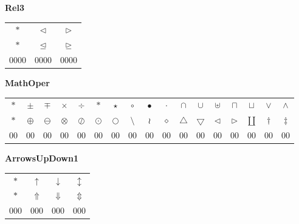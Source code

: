 \documentclass[12pt]{report}
\newlength{\mine}
\newlength{\niz}
\def\pmb{}
\begin{document}
\textbf{Rel3}
\par\nobreak\vspace{2mm}
\begin{tabular}{|c|cc|}
  \hline
   $\pmb *       $&
   $\pmb\lhd     $&
   $\pmb\rhd     $\\[\mine]
   $\pmb *       $&
   $\pmb\unlhd   $&
   $\pmb\unrhd   $\\[\niz]
  \hline\hline
  0000&0000&0000\\
  \hline
\end{tabular}
\goodbreak\par\vspace{3mm}

\newpage

\textbf{MathOper}
\par\nobreak\vspace{2mm}
\begin{tabular}{|c|cccccccccccccccc|}
  \hline
   $\pmb *              $&
   $\pmb\pm             $&
   $\pmb\mp             $&
   $\pmb\times          $&
   $\pmb\div            $&
   $\pmb\ast            $&
   $\pmb\star           $&
   $\pmb\circ           $&
   $\pmb\bullet         $&
   $\pmb\cdot           $&
   $\pmb\cap            $&
   $\pmb\cup            $&
   $\pmb\uplus          $&
   $\pmb\sqcap          $&
   $\pmb\sqcup          $&
   $\pmb\vee            $&
   $\pmb\wedge          $\\[\mine]
   $\pmb *              $&
   $\pmb\oplus          $&
   $\pmb\ominus         $&
   $\pmb\otimes         $&
   $\pmb\oslash         $&
   $\pmb\odot           $&
   $\pmb\bigcirc        $&
   $\pmb\setminus       $&
   $\pmb\wr             $&
   $\pmb\diamond        $&
   $\pmb\bigtriangleup  $&
   $\pmb\bigtriangledown$&
   $\pmb\triangleleft   $&
   $\pmb\triangleright  $&
   $\pmb\amalg          $&
   $\pmb\dagger         $&
   $\pmb\ddagger        $\\[\niz]
  \hline\hline
  00&00&00&00&00&00&00&00&00&00&00&00&00&00&00&00&00\\
  \hline
\end{tabular}
\goodbreak\par\vspace{3mm}

\newpage

\textbf{ArrowsUpDown1}
\par\nobreak\vspace{2mm}
\begin{tabular}{|c|ccc|}
  \hline
   $\pmb *             $&
   $\pmb\uparrow       $&
   $\pmb\downarrow     $&
   $\pmb\updownarrow   $\\[\mine]
   $\pmb *             $&
   $\pmb\Uparrow       $&
   $\pmb\Downarrow     $&
   $\pmb\Updownarrow   $\\[\niz]
  \hline\hline
  000&000&000&000\\
  \hline
\end{tabular}
\goodbreak\par\vspace{3mm}
\end{document}
